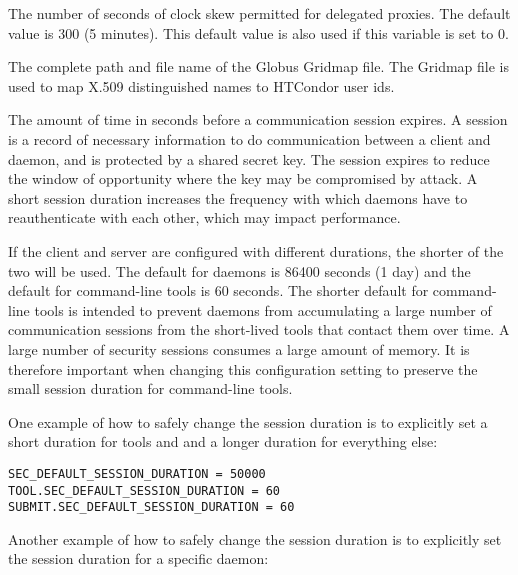 \begin{description}
\label{param:GSIDelegationClockSkewAllowable}
\item[\Macro{GSI\_DELEGATION\_CLOCK\_SKEW\_ALLOWABLE}]
  The number of seconds of clock skew permitted for delegated proxies.
  The default value is 300 (5 minutes).  This default value is also used
  if this variable is set to 0.
  
\label{param:GridMap}
\item[\Macro{GRIDMAP}]
  The complete path and file name of the Globus Gridmap file.
  The Gridmap file is used to map
  X.509 distinguished names to HTCondor user ids.

\label{param:SecDefaultSessionDuration}
\item[\Macro{SEC\_<access-level>\_SESSION\_DURATION}]
  The amount of time in seconds before
  a communication session expires.
  A session is a record of necessary information to do communication
  between a client and daemon, and is protected by a shared secret key.
  The session expires to reduce the window of opportunity where
  the key may be compromised by attack.  A short session duration
  increases the frequency with which daemons have to reauthenticate
  with each other, which may impact performance.

  If the client and server are configured with different durations,
  the shorter of the two will be used.  The default for daemons is
  86400 seconds (1 day) and the default for command-line tools is 60
  seconds.  The shorter default for command-line tools is intended to
  prevent daemons from accumulating a large number of communication
  sessions from the short-lived tools that contact them over time.  A
  large number of security sessions consumes a large amount of memory.
  It is therefore important when changing this configuration setting
  to preserve the small session duration for command-line tools.

  One example of how to safely change the session duration is to
  explicitly set a short duration for tools and 
  and a longer duration for everything else:

\begin{verbatim}
SEC_DEFAULT_SESSION_DURATION = 50000
TOOL.SEC_DEFAULT_SESSION_DURATION = 60
SUBMIT.SEC_DEFAULT_SESSION_DURATION = 60
\end{verbatim}

Another example of how to safely change the session duration is to
explicitly set the session duration for a specific daemon:


\end{description}
